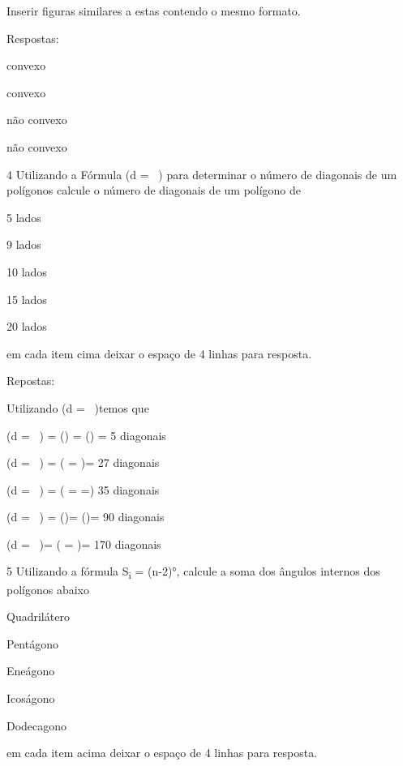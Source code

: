 Inserir figuras similares a estas contendo o mesmo formato.

Respostas:

\item convexo
\item convexo
\item não convexo
\item não convexo

\num{4} Utilizando a Fórmula (d = \ ) para determinar o
número de diagonais de um polígonos calcule o número de diagonais de um
polígono de

\item 5 lados
\item 9 lados
\item 10 lados
\item 15 lados
\item 20 lados

em cada item cima deixar o espaço de 4 linhas para resposta.

Repostas:

Utilizando (d = \ \text{\ \ })temos que

\item (d = \ ) = () =
() = 5 diagonais

\item (d = \ ) = ( = )=
27 diagonais

\item (d = \ ) =
( =  =) 35 diagonais

\item (d = \ ) = ()=
()= 90 diagonais

\item (d = \ )=
( = )= 170 diagonais

\num{5} Utilizando a fórmula S\textsubscript{i} = (n-2)°, calcule a
soma dos ângulos internos dos polígonos abaixo

\item Quadrilátero
\item Pentágono
\item Eneágono
\item Icoságono
\item Dodecagono

em cada item acima deixar o espaço de 4 linhas para resposta.


